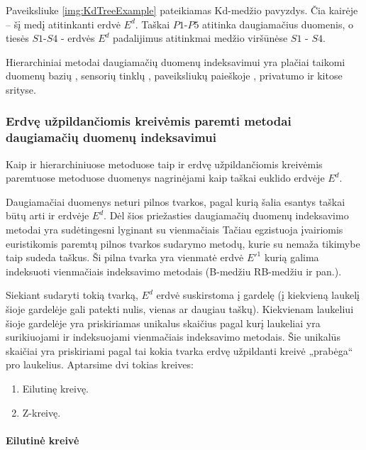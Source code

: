 Paveiksliuke \ref{img:KdTreeExample} pateikiamas Kd-medžio pavyzdys.
Čia kairėje -- šį medį atitinkanti erdvė $E^d$.
Taškai $P1$-$P5$ atitinka daugiamačius duomenis, o tiesės $S1$-$S4$ - erdvės $E^d$ padalijimus atitinkmai medžio viršūnėse $S1$ - $S4$.

Hierarchiniai metodai daugiamačių duomenų indeksavimui yra plačiai taikomi duomenų bazių \cite{bohm2001searching}, sensorių tinklų \cite{li2003multi}, paveiksliukų paieškoje \cite{silpa2008optimised}, privatumo \cite{hore2012secure} \cite{xiao2010differentially} ir kitose srityse.

\subsubsection{Erdvę užpildančiomis kreivėmis paremti metodai daugiamačių duomenų indeksavimui}

Kaip ir hierarchiniuose metoduose taip ir erdvę užpildančiomis kreivėmis paremtuose metoduose duomenys nagrinėjami kaip taškai euklido erdvėje $E^d$.

Daugiamačiai duomenys neturi pilnos tvarkos, pagal kurią šalia esantys taškai būtų arti ir erdvėje $E^d$.
Dėl šios priežasties daugiamačių duomenų indeksavimo metodai yra sudėtingesni lyginant su vienmačiais \cite{gaede1998multidimensional} \cite{bohm2001searching}
Tačiau egzistuoja įvairiomis euristikomis paremtų pilnos tvarkos sudarymo metodų, kurie su nemaža tikimybe taip sudeda taškus.
Ši pilna tvarka yra vienmatė erdvė $E'^1$ kurią galima indeksuoti vienmačiais indeksavimo metodais (B-medžiu \cite{comer1979ubiquitous} RB-medžiu \cite{hanke1997relaxed} ir pan.).

Siekiant sudaryti tokią tvarką, $E^d$ erdvė suskirstoma į gardelę (į kiekvieną laukelį šioje gardelėje gali patekti nulis, vienas ar daugiau taškų).
Kiekvienam laukeliui šioje gardelėje yra priskiriamas unikalus skaičius pagal kurį laukeliai yra surikiuojami ir indeksuojami vienmačiais indeksavimo metodais.
Šie unikalūs skaičiai yra priskiriami pagal tai kokia tvarka erdvę užpildanti kreivė \cite{bader2012space} „prabėga“ pro laukelius.
Aptarsime dvi tokias kreives:
\begin{enumerate}
	\item Eilutinę kreivę.
	\item Z-kreivę.
\end{enumerate}

\paragraph{Eilutinė kreivė}

